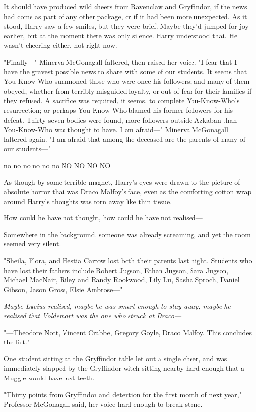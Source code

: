 It should have produced wild cheers from Ravenclaw and Gryffindor, if the news
had come as part of any other package, or if it had been more unexpected. As it
stood, Harry saw a few smiles, but they were brief. Maybe they’d jumped for joy
earlier, but at the moment there was only silence. Harry understood that. He
wasn’t cheering either, not right now.

"Finally—" Minerva McGonagall faltered, then raised her voice. "I fear that I
have the gravest possible news to share with some of our students. It seems
that You-Know-Who summoned those who were once his followers; and many of them
obeyed, whether from terribly misguided loyalty, or out of fear for their
families if they refused. A sacrifice was required, it seems, to complete
You-Know-Who’s resurrection; or perhaps You-Know-Who blamed his former
followers for his defeat. Thirty-seven bodies were found, more followers
outside Azkaban than You-Know-Who was thought to have. I am afraid—" Minerva
McGonagall faltered again. "I am afraid that among the deceased are the parents
of many of our students—"

no no no no no no NO NO NO NO

As though by some terrible magnet, Harry’s eyes were drawn to the picture of
absolute horror that was Draco Malfoy’s face, even as the comforting cotton
wrap around Harry’s thoughts was torn away like thin tissue.

How could he have not thought, how could he have not realised—

Somewhere in the background, someone was already screaming, and yet the room
seemed very silent.

"Sheila, Flora, and Hestia Carrow lost both their parents last night. Students
who have lost their fathers include Robert Jugson, Ethan Jugson, Sara Jugson,
Michael MacNair, Riley and Randy Rookwood, Lily Lu, Sasha Sproch, Daniel
Gibson, Jason Gross, Elsie Ambrose—"

\emph{Maybe Lucius realised, maybe he was smart enough to stay away, maybe he
realised that Voldemort was the one who struck at Draco—}

"—Theodore Nott, Vincent Crabbe, Gregory Goyle, Draco Malfoy. This concludes
the list."

One student sitting at the Gryffindor table let out a single cheer, and was
immediately slapped by the Gryffindor witch sitting nearby hard enough that a
Muggle would have lost teeth.

"Thirty points from Gryffindor and detention for the first month of next year,"
Professor McGonagall said, her voice hard enough to break stone.

